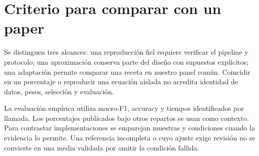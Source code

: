 \section{Criterio para comparar con un paper}
Se distinguen tres alcances: una reproducción fiel requiere verificar el pipeline y protocolo; una aproximación conserva parte del diseño con supuestos explícitos; una adaptación permite comparar una receta en nuestro panel común. Coincidir en un porcentaje o reproducir una ecuación aislada no acredita identidad de datos, pesos, selección y evaluación.

La evaluación empírica utiliza macro-F1, accuracy y tiempos identificados por llamada. Los porcentajes publicados bajo otros repartos se usan como contexto. Para contrastar implementaciones se emparejan muestras y condiciones cuando la evidencia lo permite. Una referencia incompleta o cuyo ajuste exige revisión no se convierte en una media validada por omitir la condición fallida.
